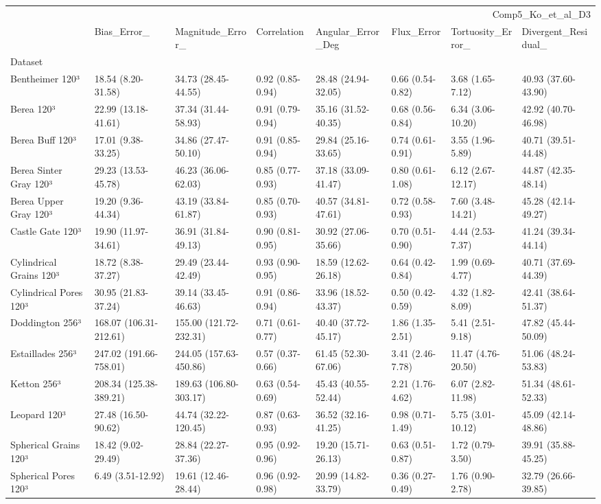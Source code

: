 \begin{tabular}{llllllll}
\toprule
 & \multicolumn{7}{r}{Comp5_Ko_et_al_D3} \\
 & Bias_Error_ & Magnitude_Error_ & Correlation & Angular_Error_Deg & Flux_Error & Tortuosity_Error_ & Divergent_Residual_ \\
Dataset &  &  &  &  &  &  &  \\
\midrule
Bentheimer 120³ & 18.54 (8.20-31.58) & 34.73 (28.45-44.55) & 0.92 (0.85-0.94) & 28.48 (24.94-32.05) & 0.66 (0.54-0.82) & 3.68 (1.65-7.12) & 40.93 (37.60-43.90) \\
Berea 120³ & 22.99 (13.18-41.61) & 37.34 (31.44-58.93) & 0.91 (0.79-0.94) & 35.16 (31.52-40.35) & 0.68 (0.56-0.84) & 6.34 (3.06-10.20) & 42.92 (40.70-46.98) \\
Berea Buff 120³ & 17.01 (9.38-33.25) & 34.86 (27.47-50.10) & 0.91 (0.85-0.94) & 29.84 (25.16-33.65) & 0.74 (0.61-0.91) & 3.55 (1.96-5.89) & 40.71 (39.51-44.48) \\
Berea Sinter Gray 120³ & 29.23 (13.53-45.78) & 46.23 (36.06-62.03) & 0.85 (0.77-0.93) & 37.18 (33.09-41.47) & 0.80 (0.61-1.08) & 6.12 (2.67-12.17) & 44.87 (42.35-48.14) \\
Berea Upper Gray 120³ & 19.20 (9.36-44.34) & 43.19 (33.84-61.87) & 0.85 (0.70-0.93) & 40.57 (34.81-47.61) & 0.72 (0.58-0.93) & 7.60 (3.48-14.21) & 45.28 (42.14-49.27) \\
Castle Gate 120³ & 19.90 (11.97-34.61) & 36.91 (31.84-49.13) & 0.90 (0.81-0.95) & 30.92 (27.06-35.66) & 0.70 (0.51-0.90) & 4.44 (2.53-7.37) & 41.24 (39.34-44.14) \\
Cylindrical Grains 120³ & 18.72 (8.38-37.27) & 29.49 (23.44-42.49) & 0.93 (0.90-0.95) & 18.59 (12.62-26.18) & 0.64 (0.42-0.84) & 1.99 (0.69-4.77) & 40.71 (37.69-44.39) \\
Cylindrical Pores 120³ & 30.95 (21.83-37.24) & 39.14 (33.45-46.63) & 0.91 (0.86-0.94) & 33.96 (18.52-43.37) & 0.50 (0.42-0.59) & 4.32 (1.82-8.09) & 42.41 (38.64-51.37) \\
Doddington 256³ & 168.07 (106.31-212.61) & 155.00 (121.72-232.31) & 0.71 (0.61-0.77) & 40.40 (37.72-45.17) & 1.86 (1.35-2.51) & 5.41 (2.51-9.18) & 47.82 (45.44-50.09) \\
Estaillades 256³ & 247.02 (191.66-758.01) & 244.05 (157.63-450.86) & 0.57 (0.37-0.66) & 61.45 (52.30-67.06) & 3.41 (2.46-7.78) & 11.47 (4.76-20.50) & 51.06 (48.24-53.83) \\
Ketton 256³ & 208.34 (125.38-389.21) & 189.63 (106.80-303.17) & 0.63 (0.54-0.69) & 45.43 (40.55-52.44) & 2.21 (1.76-4.62) & 6.07 (2.82-11.98) & 51.34 (48.61-52.33) \\
Leopard 120³ & 27.48 (16.50-90.62) & 44.74 (32.22-120.45) & 0.87 (0.63-0.93) & 36.52 (32.16-41.25) & 0.98 (0.71-1.49) & 5.75 (3.01-10.12) & 45.09 (42.14-48.86) \\
Spherical Grains 120³ & 18.42 (9.02-29.49) & 28.84 (22.27-37.36) & 0.95 (0.92-0.96) & 19.20 (15.71-26.13) & 0.63 (0.51-0.87) & 1.72 (0.79-3.50) & 39.91 (35.88-45.25) \\
Spherical Pores 120³ & 6.49 (3.51-12.92) & 19.61 (12.46-28.44) & 0.96 (0.92-0.98) & 20.99 (14.82-33.79) & 0.36 (0.27-0.49) & 1.76 (0.90-2.78) & 32.79 (26.66-39.85) \\
\bottomrule
\end{tabular}
